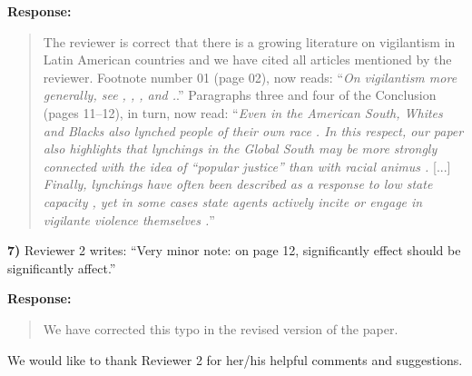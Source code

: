 \documentclass[a4paper,12pt]{article}
\begin{document}
\vspace{.3cm}

\noindent \textbf{Response:} 
\begin{quote}

The reviewer is correct that there is a growing literature on vigilantism in
Latin American countries and we have cited all articles mentioned by the
reviewer. Footnote number 01 (page 02), now reads: ``\textit{On vigilantism
  more generally, see \citet{cohen2022collective},
\citet{schuberth2013challenging}, \citet{smith2019contradictions}, and
\citet{zizumbo2017community}.}.'' Paragraphs three and four of the Conclusion
(pages 11--12), in turn, now read: ``\textit{Even in the American South, Whites
  and Blacks also lynched people of their own race \citep{beck1997race}. In
  this respect, our paper also highlights that lynchings in the Global South
  may be more strongly connected with the idea of ``popular justice'' than with
  racial animus \citep{kloppe2019lynching, martins2015linchamentos}.} [...]
  \textit{Finally, lynchings have often been described as a response to low
    state capacity \citep{trevizo2022mexico}, yet in some cases state agents
    actively incite or engage in vigilante violence themselves
  \citep{arias2010violent}.}''

\end{quote}

\vspace{.3cm}

\noindent \textbf{7)} Reviewer 2 writes: ``Very minor note: on page 12,
significantly effect should be significantly affect.''

\vspace{.3cm}

\noindent \textbf{Response:} 
\begin{quote}
    We have corrected this typo in the revised version of the paper.
\end{quote}

\vspace{.3cm}

We would like to thank Reviewer 2 for her/his helpful comments and suggestions.

\newpage


\end{document}
